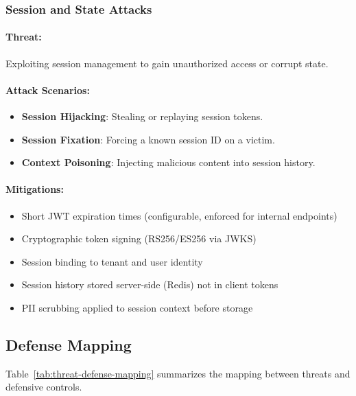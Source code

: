 \subsubsection{Session and State Attacks}

\paragraph{Threat:} Exploiting session management to gain unauthorized access or corrupt state.

\paragraph{Attack Scenarios:}
\begin{itemize}
    \item \textbf{Session Hijacking}: Stealing or replaying session tokens.
    \item \textbf{Session Fixation}: Forcing a known session ID on a victim.
    \item \textbf{Context Poisoning}: Injecting malicious content into session history.
\end{itemize}

\paragraph{Mitigations:}
\begin{itemize}
    \item Short JWT expiration times (configurable, enforced for internal endpoints)
    \item Cryptographic token signing (RS256/ES256 via JWKS)
    \item Session binding to tenant and user identity
    \item Session history stored server-side (Redis) not in client tokens
    \item PII scrubbing applied to session context before storage
\end{itemize}

\subsection{Defense Mapping}
\label{subsec:defense-mapping}

Table~\ref{tab:threat-defense-mapping} summarizes the mapping between threats and defensive controls.

